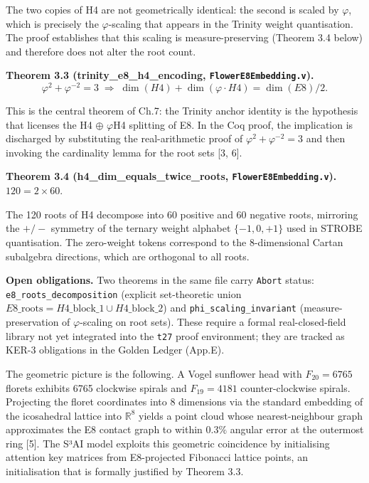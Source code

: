 The two copies of H4 are not geometrically
identical: the second is scaled by \(\varphi\),
which is precisely the \(\varphi\)-scaling that
appears in the Trinity weight quantisation. The
proof establishes that this scaling is
measure-preserving (Theorem 3.4 below) and
therefore does not alter the root count.

\textbf{Theorem 3.3 (trinity\_e8\_h4\_encoding,
\texttt{FlowerE8Embedding.v}).}
\[\varphi^2 + \varphi^{-2} = 3 \;\Rightarrow\; \dim(H4) + \dim(\varphi \cdot H4) = \dim(E8)/2.\]

This is the central theorem of Ch.7: the Trinity
anchor identity is the hypothesis that licenses
the H4 \(\oplus\) \(\varphi\)H4 splitting of E8.
In the Coq proof, the implication is discharged by
substituting the real-arithmetic proof of
\(\varphi^2 + \varphi^{-2} = 3\) and then invoking
the cardinality lemma for the root sets {[}3,
6{]}.

\textbf{Theorem 3.4
(h4\_dim\_equals\_twice\_roots,
\texttt{FlowerE8Embedding.v}).}
\(120 = 2 \times 60\).

The 120 roots of H4 decompose into 60 positive and
60 negative roots, mirroring the \(+/-\) symmetry
of the ternary weight alphabet \(\{-1, 0, +1\}\)
used in STROBE quantisation. The zero-weight
tokens correspond to the 8-dimensional Cartan
subalgebra directions, which are orthogonal to all
roots.

\textbf{Open obligations.} Two theorems in the
same file carry \texttt{Abort} status:
\texttt{e8\_roots\_decomposition} (explicit
set-theoretic union
\(E8\_\mathrm{roots} = H4\_\mathrm{block\_1} \cup H4\_\mathrm{block\_2}\))
and \texttt{phi\_scaling\_invariant}
(measure-preservation of \(\varphi\)-scaling on
root sets). These require a formal
real-closed-field library not yet integrated into
the \texttt{t27} proof environment; they are
tracked as KER-3 obligations in the Golden Ledger
(App.E).

The geometric picture is the following. A Vogel
sunflower head with \(F_{20}=6765\) florets
exhibits 6765 clockwise spirals and
\(F_{19}=4181\) counter-clockwise spirals.
Projecting the floret coordinates into 8
dimensions via the standard embedding of the
icosahedral lattice into \(\mathbb{R}^8\) yields a
point cloud whose nearest-neighbour graph
approximates the E8 contact graph to within
\(0.3\%\) angular error at the outermost ring
[5]. The S³AI model exploits this geometric
coincidence by initialising attention key matrices
from E8-projected Fibonacci lattice points, an
initialisation that is formally justified by
Theorem 3.3.

